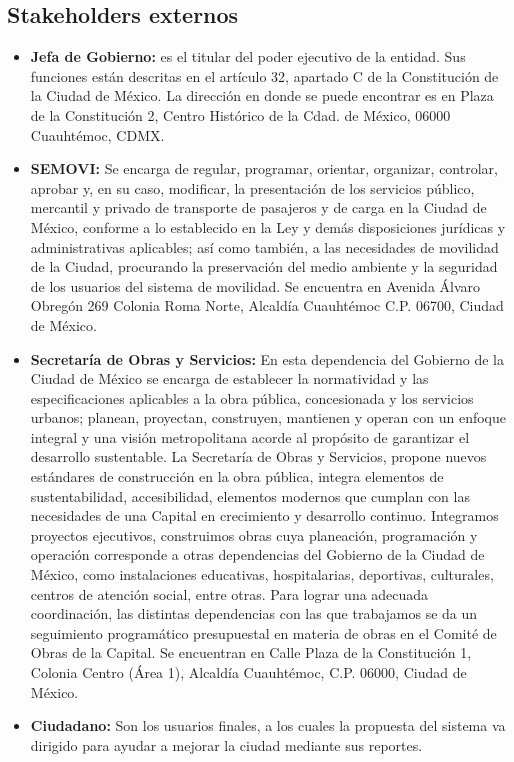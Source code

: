 \documentclass[12pt,twoside, a4paper]{article}
\begin{document}
\subsection{Stakeholders externos}
\begin{itemize}
    \item \textbf{Jefa de Gobierno: }es el titular del poder ejecutivo de la entidad.
        Sus funciones están descritas en el artículo 32, apartado C de la Constitución
        de la Ciudad de México. La dirección en donde se puede encontrar es en Plaza 
        de la Constitución 2, Centro Histórico de la Cdad. de México, 06000 
        Cuauhtémoc, CDMX.
    \item \textbf{SEMOVI: }Se encarga de regular, programar, orientar, organizar, 
        controlar, aprobar y, en su caso, modificar, la presentación de los servicios 
        público, mercantil y privado de transporte de pasajeros y de carga en la 
        Ciudad de México, conforme a lo establecido en la Ley y demás disposiciones 
        jurídicas y administrativas aplicables; así como también, a las necesidades de 
        movilidad de la Ciudad, procurando la preservación del medio ambiente y la 
        seguridad de los usuarios del sistema de movilidad. Se encuentra en Avenida 
        Álvaro Obregón 269 Colonia Roma Norte, Alcaldía Cuauhtémoc C.P. 06700, Ciudad 
        de México.
    \item \textbf{Secretaría de Obras y Servicios: }En esta dependencia del Gobierno 
        de la Ciudad de México se encarga de establecer la normatividad y las 
        especificaciones aplicables a la obra pública, concesionada y los servicios 
        urbanos; planean, proyectan, construyen, mantienen y operan con un 
        enfoque integral y una visión metropolitana acorde al propósito de garantizar 
        el desarrollo sustentable. La Secretaría de Obras y Servicios, propone nuevos 
        estándares de construcción en la obra pública, integra elementos de sustentabilidad, 
        accesibilidad, elementos modernos que cumplan con las necesidades de una Capital 
        en crecimiento y desarrollo continuo. Integramos proyectos ejecutivos, construimos 
        obras cuya planeación, programación y operación corresponde a otras dependencias 
        del Gobierno de la Ciudad de México, como instalaciones educativas, hospitalarias, 
        deportivas, culturales, centros de atención social, entre otras. Para lograr una 
        adecuada coordinación, las distintas dependencias con las que trabajamos se da 
        un seguimiento programático presupuestal en materia de obras en el Comité de Obras 
        de la Capital. Se encuentran en Calle Plaza de la Constitución 1, Colonia Centro 
        (Área 1), Alcaldía Cuauhtémoc, C.P. 06000, Ciudad de México.
    \item \textbf{Ciudadano: }Son los usuarios finales, a los cuales la propuesta del 
        sistema va dirigido para ayudar a mejorar la ciudad mediante sus reportes.
\end{itemize}
\end{document}

